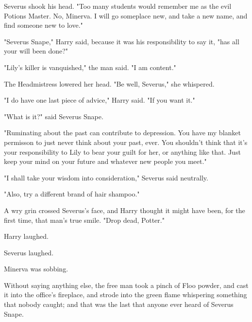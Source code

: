 Severus shook his head. "Too many students would remember me as the evil
Potions Master. No, Minerva. I will go someplace new, and take a new name, and
find someone new to love."

"Severus Snape," Harry said, because it was his responsibility to say it, "has
all your will been done?"

"Lily's killer is vanquished," the man said. "I am content."

The Headmistress lowered her head. "Be well, Severus," she whispered.

"I do have one last piece of advice," Harry said. "If you want it."

"What is it?" said Severus Snape.

"Ruminating about the past can contribute to depression. You have my blanket
permisson to just never think about your past, ever. You shouldn't think that
it's your responsibility to Lily to bear your guilt for her, or anything like
that. Just keep your mind on your future and whatever new people you meet."

"I shall take your wisdom into consideration," Severus said neutrally.

"Also, try a different brand of hair shampoo."

A wry grin crossed Severus's face, and Harry thought it might have been, for
the first time, that man's true smile. "Drop dead, Potter."

Harry laughed.

Severus laughed.

Minerva was sobbing.

Without saying anything else, the free man took a pinch of Floo powder, and
cast it into the office's fireplace, and strode into the green flame whispering
something that nobody caught; and that was the last that anyone ever heard of
Severus Snape.
